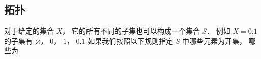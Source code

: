 

\subsection{拓扑}

对于给定的集合 $X$， 它的所有不同的子集也可以构成一个集合 $S$． 例如 $X = \qty{0, 1}$ 的子集有 $\varnothing$， $\qty{0}$， $\qty{1}$， $\qty{0, 1}$ 如果我们按照以下规则指定 $S$ 中哪些元素为开集， 哪些为
